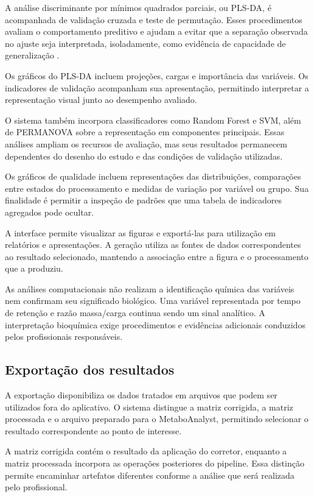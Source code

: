 A análise discriminante por mínimos quadrados parciais, ou PLS-DA, é acompanhada de validação cruzada e teste de permutação. Esses procedimentos avaliam o comportamento preditivo e ajudam a evitar que a separação observada no ajuste seja interpretada, isoladamente, como evidência de capacidade de generalização \cite{westerhuis2008assessment}.

Os gráficos do PLS-DA incluem projeções, cargas e importância das variáveis. Os indicadores de validação acompanham sua apresentação, permitindo interpretar a representação visual junto ao desempenho avaliado.

O sistema também incorpora classificadores como Random Forest \cite{breiman2001random} e SVM, além de PERMANOVA sobre a representação em componentes principais. Essas análises ampliam os recursos de avaliação, mas seus resultados permanecem dependentes do desenho do estudo e das condições de validação utilizadas.

Os gráficos de qualidade incluem representações das distribuições, comparações entre estados do processamento e medidas de variação por variável ou grupo. Sua finalidade é permitir a inspeção de padrões que uma tabela de indicadores agregados pode ocultar.

A interface permite visualizar as figuras e exportá-las para utilização em relatórios e apresentações. A geração utiliza as fontes de dados correspondentes ao resultado selecionado, mantendo a associação entre a figura e o processamento que a produziu.

As análises computacionais não realizam a identificação química das variáveis nem confirmam seu significado biológico. Uma variável representada por tempo de retenção e razão massa/carga continua sendo um sinal analítico. A interpretação bioquímica exige procedimentos e evidências adicionais conduzidos pelos profissionais responsáveis.

\subsection{Exportação dos resultados}
\label{subsec:exportacao-resultados}

A exportação disponibiliza os dados tratados em arquivos que podem ser utilizados fora do aplicativo. O sistema distingue a matriz corrigida, a matriz processada e o arquivo preparado para o MetaboAnalyst, permitindo selecionar o resultado correspondente ao ponto de interesse.

A matriz corrigida contém o resultado da aplicação do corretor, enquanto a matriz processada incorpora as operações posteriores do pipeline. Essa distinção permite encaminhar artefatos diferentes conforme a análise que será realizada pelo profissional.

